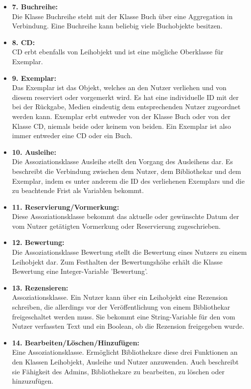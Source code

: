 \documentclass[fontsize=12pt,paper=a4,twoside]{scrartcl}
\begin{document}
\begin{itemize}
\item \textbf{7. Buchreihe:}\\
Die Klasse Buchreihe steht mit der Klasse Buch über eine Aggregation in Verbindung.
Eine Buchreihe kann beliebig viele Buchobjekte besitzen.
 
\item \textbf{8. CD:}\\
CD erbt ebenfalls von Leihobjekt und ist eine mögliche Oberklasse für Exemplar.

\item \textbf{9. Exemplar:}\\
Das Exemplar ist das Objekt, welches an den Nutzer verliehen und von diesem reserviert oder vorgemerkt wird. Es hat eine individuelle ID mit der bei der Rückgabe, Medien
eindeutig dem entsprechenden Nutzer zugeordnet werden kann. Exemplar erbt entweder von
der Klasse Buch oder von der Klasse CD, niemals beide oder keinem von beiden. Ein Exemplar ist also immer entweder eine CD oder ein Buch.

\item \textbf{10. Ausleihe:}\\
Die Assoziationsklasse Ausleihe stellt den Vorgang des Ausleihens dar.
Es beschreibt die Verbindung zwischen dem Nutzer, dem Bibliothekar und dem Exemplar, indem es unter anderem die ID des verliehenen Exemplars und die zu beachtende Frist 
als Variablen bekommt. 


\item \textbf{11. Reservierung/Vormerkung:}\\
Diese Assoziationsklasse bekommt das aktuelle oder gewünschte Datum der vom Nutzer getätigten Vormerkung oder Reservierung zugeschrieben.

\item \textbf{12. Bewertung:}\\
Die Assoziationsklasse Bewertung stellt die Bewertung eines Nutzers zu einem Leihobjekt dar. Zum Festhalten der Bewertungshöhe erhält die Klasse Bewertung
eine Integer-Variable 'Bewertung'.

\item \textbf{13. Rezensieren:}\\
Assoziationsklasse. Ein Nutzer kann über ein Leihobjekt eine Rezension schreiben, die allerdings vor der Veröffentlichung von einem Bibliothekar freigeschaltet werden muss. Sie bekommt eine String-Variable für den vom Nutzer verfassten Text und ein Boolean, ob die Rezension freigegeben wurde.

\item \textbf{14. Bearbeiten/Löschen/Hinzufügen:}\\
Eine Assoziationsklasse. Ermöglicht Bibliothekare diese drei Funktionen an den Klassen 
Leihobjekt, Ausleihe und Nutzer anzuwenden. Auch beschreibt sie Fähigkeit des Admins,
Bibliothekare zu bearbeiten, zu löschen oder hinzuzufügen.
\end{itemize}
\end{document}
